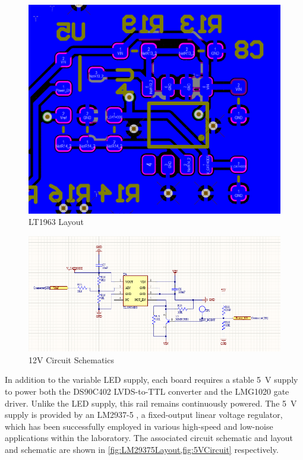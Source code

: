 \documentclass[a4paper,11pt]{article}
\begin{document}
\begin{figure}[htbp]
\centering
\includegraphics[scale=0.5]{LT1963layout.png}
\caption{LT1963 Layout\label{fig:LT1963Layout}}
\end{figure}

\begin{figure}[h]
\centering
\includegraphics[scale=0.5]{12VVariablePSU.png}
\caption{12V Circuit Schematics\label{fig:12VVariablePSU}}
\end{figure}

In addition to the variable LED supply, each board requires a stable 5~V supply to power both the DS90C402 LVDS-to-TTL converter and the LMG1020 gate driver. Unlike the LED supply, this rail remains continuously powered. The 5~V supply is provided by an LM2937-5 \cite{LM2347-5}, a fixed-output linear voltage regulator, which has been successfully employed in various high-speed and low-noise applications within the laboratory. The associated circuit schematic and layout and schematic are shown in \cref{fig:LM29375Layout,fig:5VCircuit} respectively.
\end{document}
